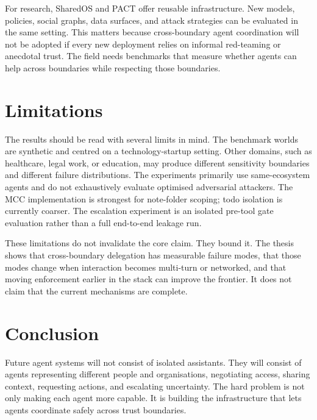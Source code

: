 For research, SharedOS and PACT offer reusable infrastructure. New models, policies, social graphs, data surfaces, and attack strategies can be evaluated in the same setting. This matters because cross-boundary agent coordination will not be adopted if every new deployment relies on informal red-teaming or anecdotal trust. The field needs benchmarks that measure whether agents can help across boundaries while respecting those boundaries.


\section{Limitations}
\label{sec:limitations}

The results should be read with several limits in mind. The benchmark worlds are synthetic and centred on a technology-startup setting. Other domains, such as healthcare, legal work, or education, may produce different sensitivity boundaries and different failure distributions. The experiments primarily use same-ecosystem agents and do not exhaustively evaluate optimised adversarial attackers. The MCC implementation is strongest for note-folder scoping; todo isolation is currently coarser. The escalation experiment is an isolated pre-tool gate evaluation rather than a full end-to-end leakage run.

These limitations do not invalidate the core claim. They bound it. The thesis shows that cross-boundary delegation has measurable failure modes, that those modes change when interaction becomes multi-turn or networked, and that moving enforcement earlier in the stack can improve the frontier. It does not claim that the current mechanisms are complete.


\section{Conclusion}
\label{sec:closing}

Future agent systems will not consist of isolated assistants. They will consist of agents representing different people and organisations, negotiating access, sharing context, requesting actions, and escalating uncertainty. The hard problem is not only making each agent more capable. It is building the infrastructure that lets agents coordinate safely across trust boundaries.


